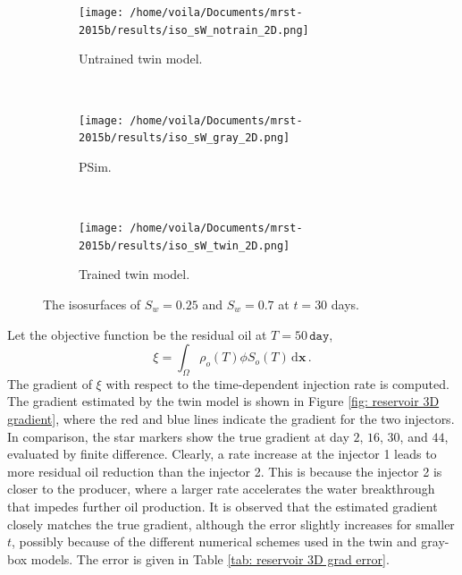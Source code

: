 \begin{figure}[htbp]\begin{center}
    \begin{subfigure}[t]{.99\textwidth}
        \centering
        \texttt{[image: /home/voila/Documents/mrst-2015b/results/iso\_sW\_notrain\_2D.png]}
        \label{fig: reservoir 3D untrained}
        \caption{Untrained twin model.}
    \end{subfigure}\\
    \begin{subfigure}[t]{.99\textwidth}
        \centering
        \texttt{[image: /home/voila/Documents/mrst-2015b/results/iso\_sW\_gray\_2D.png]}
        \label{fig: reservoir 3D untrained}
        \caption{PSim.}
    \end{subfigure}\\
    \begin{subfigure}[t]{.99\textwidth}
        \centering
        \texttt{[image: /home/voila/Documents/mrst-2015b/results/iso\_sW\_twin\_2D.png]}
        \label{fig: reservoir 3D untrained}
        \caption{Trained twin model.}
    \end{subfigure}
    \caption{The isosurfaces of $S_w=0.25$ and $S_w=0.7$ at $t=30$ days. }
    \label{fig: reservoir 3D solutions}
\end{center}\end{figure}

Let the objective function be the residual oil at $T=50 \, \texttt{day}$,
\begin{equation}
    \xi = \int_\Omega \rho_o(T) \phi S_o(T) \,\textrm{d} \boldsymbol{x} \,.
    \label{eqn: chap2 reservoir xi day 50}
\end{equation}
The gradient of $\xi$ with respect to the time-dependent injection rate is computed.
The gradient estimated by the twin model is shown in Figure \ref{fig: reservoir 3D gradient},
where the red and blue lines indicate the gradient for the two injectors. In comparison, 
the star markers show the true gradient at day $2$, $16$, $30$, and $44$, evaluated by finite difference.
Clearly, a rate increase at the injector 1 leads to more residual oil reduction than the injector 2.
This is because the injector 2 is closer to the producer, where a larger rate accelerates the 
water breakthrough that impedes further oil production.
It is observed that the estimated gradient closely matches the true gradient, although
the error slightly increases for smaller $t$, possibly because of the different numerical schemes
used in the twin and gray-box models. The error is given in Table \ref{tab: reservoir 3D grad error}.\\

